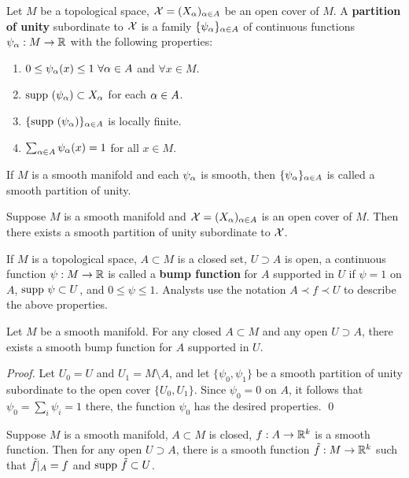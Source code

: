 \begin{definition}
    Let $M$ be a topological space, $\mathcal{X}=(X_\alpha)_{\alpha \in A}$ be an open cover of $M$. A \textbf{partition of unity} subordinate to $\mathcal{X}$ is a family $\{\psi_\alpha\}_{\alpha \in A}$ of continuous functions $\psi_\alpha:M \to \mathbb{R}$ with the following properties:
    \begin{enumerate}
    \item $0 \leq \psi_\alpha(x) \leq 1 ~\forall \alpha \in A$ and $\forall x \in M$.
    \item $\mathrm{supp~} (\psi_\alpha) \subset X_\alpha$ for each $\alpha \in A$. 
    \item $\{\mathrm{supp~} (\psi_\alpha)\}_{\alpha \in A}$ is locally finite.
    \item $\sum_{\alpha \in A} \psi_\alpha(x) = 1$ for all $x \in M$. 
    \end{enumerate}
    If $M$ is a smooth manifold and each $\psi_\alpha$ is smooth, then $\{\psi_\alpha\}_{\alpha \in A}$ is called a smooth partition of unity. 
\end{definition}

\begin{theorem}\label{Lee2.23}
    Suppose $M$ is a smooth manifold and $\mathcal{X} = (X_\alpha)_{\alpha \in A}$ is an open cover of $M$. Then there exists a smooth partition of unity subordinate to $\mathcal{X}$. 
\end{theorem}

If $M$ is a topological space, $A \subset M$ is a closed set, $U \supset A$ is open, a continuous function $\psi:M \to \mathbb{R}$ is called a \textbf{bump function} for $A$ supported in $U$ if $\psi = 1$ on $A$, $\mathrm{supp~} \psi \subset U$, and $0 \leq \psi \leq 1$. Analysts use the notation $A \prec f \prec U$ to describe the above properties. 
\begin{proposition}\label{Lee2.25}
    Let $M$ be a smooth manifold. For any closed $A \subset M$ and any open $U \supset A$, there exists a smooth bump function for $A$ supported in $U$. 
\end{proposition}
\begin{proof}
    Let $U_0 = U$ and $U_1 = M \setminus A$, and let $\{\psi_0, \psi_1\}$ be a smooth partition of unity subordinate to the open cover $\{U_0, U_1\}$. Since $\psi_0 = 0$ on $A$, it follows that $\psi_0 = \sum_i \psi_i = 1$ there, the function $\psi_0$ has the desired properties. \qed 
\end{proof}
\begin{lemma}
    Suppose $M$ is a smooth manifold, $A \subset M$ is closed, $f:A \to \mathbb{R}^k$ is a smooth function. Then for any open $U \supset A$, there is a smooth function $\Tilde{f}:M \to \mathbb{R}^k$ such that $\Tilde{f}|_A = f$ and $\mathrm{supp~} \Tilde{f} \subset U$. 
\end{lemma}

